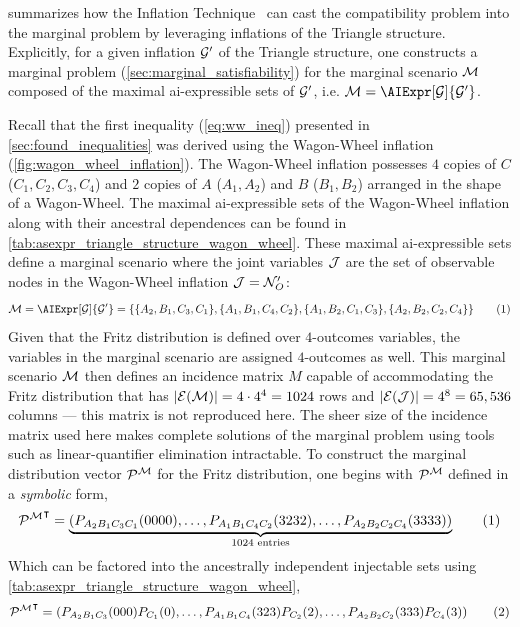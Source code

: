 \documentclass[aps, 10pt, english, twoside, pra, nofootinbib, tightenlines, longbibliography, superscriptaddress]{revtex4-1}
\begin{document}
     summarizes how the Inflation Technique~\cite{Inflation} can cast the compatibility problem into the marginal problem by leveraging inflations of the Triangle structure. Explicitly, for a given inflation $\mathcal{G}'$ of the Triangle structure, one constructs a marginal problem (\cref{sec:marginal_satisfiability}) for the marginal scenario $\mathcal{M}$ composed of the maximal ai-expressible sets of $\mathcal{G}'$, i.e. $\mscenario = \AIExpr[\graph]{\graph'}$.

    Recall that the first inequality (\cref{eq:ww_ineq}) presented in \cref{sec:found_inequalities} was derived using the Wagon-Wheel inflation (\cref{fig:wagon_wheel_inflation}). The Wagon-Wheel inflation possesses $4$ copies of $C$ ($C_1, C_2, C_3, C_4$) and $2$ copies of $A$ ($A_1, A_2$) and $B$ ($B_1, B_2$) arranged in the shape of a Wagon-Wheel. The maximal ai-expressible sets of the Wagon-Wheel inflation along with their ancestral dependences can be found in \cref{tab:asexpr_triangle_structure_wagon_wheel}. These maximal ai-expressible sets define a marginal scenario where the joint variables $\mathcal{J}$ are the set of observable nodes in the Wagon-Wheel inflation $\mathcal{J} = \mathcal{N}'_O$:
    \[ \mscenario = \AIExpr[\graph]{\graph'} = \bc{\bc{A_2, B_1, C_3, C_1}, \bc{A_1, B_1, C_4, C_2}, \bc{A_1, B_2, C_1, C_3}, \bc{A_2, B_2, C_2, C_4}} \eq \label{eq:wagon_wheel_marginal_model}\]
    Given that the Fritz distribution is defined over $4$-outcomes variables, the variables in the marginal scenario are assigned $4$-outcomes as well. This marginal scenario $\mathcal{M}$ then defines an incidence matrix $M$ capable of accommodating the Fritz distribution that has $\abs{\Events{\mscenario}} = 4 \cdot 4^{4} = 1024$ rows and $\abs{\Events{\jointvar}} = 4^8 = 65,536$ columns --- this matrix is not reproduced here. The sheer size of the incidence matrix used here makes complete solutions of the marginal problem using tools such as linear-quantifier elimination intractable. To construct the marginal distribution vector $\probvec^{\mscenario}$ for the Fritz distribution, one begins with $\probvec^{\mscenario}$ defined in a \textit{symbolic} form,
    \[ {\probvec^{\mscenario}}^{\intercal} = \underbrace{\br{\prob[A_2B_1C_3C_1]\br{0000}, \ldots, \prob[A_1B_1C_4C_2]\br{3232}, \ldots, \prob[A_2B_2C_2C_4]\br{3333}}}_{1024 \text{ entries}} \eq \label{eq:marginal_vector_wagon_wheel} \]
    Which can be factored into the ancestrally independent injectable sets using \cref{tab:asexpr_triangle_structure_wagon_wheel},
    \[ {\probvec^{\mscenario}}^{\intercal} = \br{\prob[A_2B_1C_3]\br{000}\prob[C_1]\br{0}, \ldots, \prob[A_1B_1C_4]\br{323}\prob[C_2]\br{2}, \ldots, \prob[A_2B_2C_2]\br{333}\prob[C_4]\br{3}} \eq \label{eq:marginal_vector_wagon_wheel_factors}\]
\end{document}
